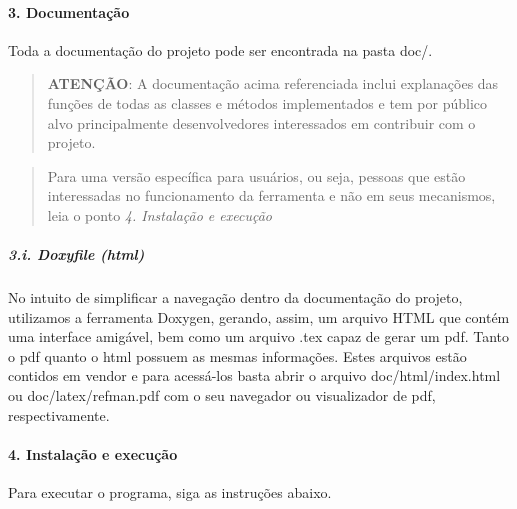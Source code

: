 \paragraph*{3. Documentação}

Toda a documentação do projeto pode ser encontrada na pasta doc/.

\begin{quotation}
{\bfseries A\-T\-E\-NÇÃ\-O}\-: A documentação acima referenciada inclui explanações das funções de todas as classes e métodos implementados e tem por público alvo principalmente desenvolvedores interessados em contribuir com o projeto.

\end{quotation}


\begin{quotation}
Para uma versão específica para usuários, ou seja, pessoas que estão interessadas no funcionamento da ferramenta e não em seus mecanismos, leia o ponto {\itshape 4. Instalação e execução}

\end{quotation}


\subparagraph*{3.\-i. Doxyfile (html)}

No intuito de simplificar a navegação dentro da documentação do projeto, utilizamos a ferramenta Doxygen, gerando, assim, um arquivo H\-T\-M\-L que contém uma interface amigável, bem como um arquivo .tex capaz de gerar um pdf. Tanto o pdf quanto o html possuem as mesmas informações. Estes arquivos estão contidos em vendor e para acessá-\/los basta abrir o arquivo doc/html/index.\-html ou doc/latex/refman.\-pdf com o seu navegador ou visualizador de pdf, respectivamente.

\paragraph*{4. Instalação e execução}

Para executar o programa, siga as instruções abaixo.


